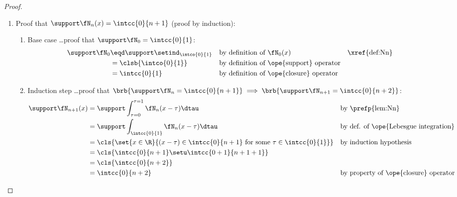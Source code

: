 \begin{proof}
\begin{enumerate}
  \item Proof that $\support\fN_n(x) = \intcc{0}{n+1}$ (proof by induction):  \label{item:bspline_Nprop_supp}
    \begin{enumerate}
      \item Base case \ldots proof that $\support\fN_0=\intcc{0}{1}$:
        \begin{align*}
          \support\fN_0
            &\eqd \support\setind_\intco{0}{1}
            && \text{by definition of $\fN_0(x)$}
            && \text{\xref{def:Nn}}
          \\&= \clsb{\intco{0}{1}}
            && \text{by definition of \ope{support} operator}
          \\&= \intcc{0}{1}
            && \text{by definition of \ope{closure} operator}
        \end{align*}
      \item Induction step \ldots proof that $\brb{\support\fN_n=\intcc{0}{n+1}}\implies\brb{\support\fN_{n+1}=\intcc{0}{n+2}}$:
        \begin{align*}
          \support\fN_{n+1}(x)
            &= \support\int_{\tau=0}^{\tau=1} \fN_n(x-\tau) \dtau
            && \text{by \prefp{lem:Nn}}
          \\&= \support\int_\intcc{0}{1} \fN_n(x-\tau) \dtau
            && \text{by def. of \ope{Lebesgue integration}}
          \\&= \cls{\set{x\in\R}{(x-\tau)\in\intcc{0}{n+1} \text{ for some } \tau\in\intcc{0}{1}}}
            && \text{by induction hypothesis}
          \\&= \cls{\intcc{0}{n+1}\setu\intcc{0+1}{n+1+1}}
          \\&= \cls{\intcc{0}{n+2}}
          \\&= \intcc{0}{n+2}
            && \text{by property of \ope{closure} operator}
        \end{align*}
    \end{enumerate}


\end{enumerate}
\end{proof}

